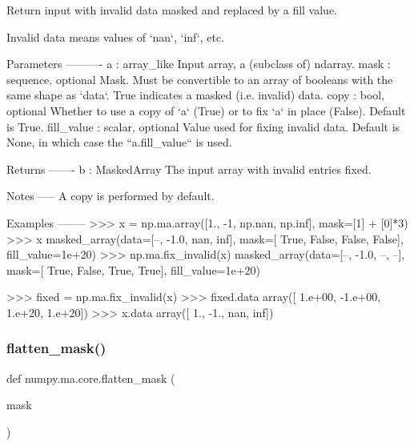 \begin{DoxyVerb}Return input with invalid data masked and replaced by a fill value.

Invalid data means values of `nan`, `inf`, etc.

Parameters
----------
a : array_like
    Input array, a (subclass of) ndarray.
mask : sequence, optional
    Mask. Must be convertible to an array of booleans with the same
    shape as `data`. True indicates a masked (i.e. invalid) data.
copy : bool, optional
    Whether to use a copy of `a` (True) or to fix `a` in place (False).
    Default is True.
fill_value : scalar, optional
    Value used for fixing invalid data. Default is None, in which case
    the ``a.fill_value`` is used.

Returns
-------
b : MaskedArray
    The input array with invalid entries fixed.

Notes
-----
A copy is performed by default.

Examples
--------
>>> x = np.ma.array([1., -1, np.nan, np.inf], mask=[1] + [0]*3)
>>> x
masked_array(data=[--, -1.0, nan, inf],
             mask=[ True, False, False, False],
       fill_value=1e+20)
>>> np.ma.fix_invalid(x)
masked_array(data=[--, -1.0, --, --],
             mask=[ True, False,  True,  True],
       fill_value=1e+20)

>>> fixed = np.ma.fix_invalid(x)
>>> fixed.data
array([ 1.e+00, -1.e+00,  1.e+20,  1.e+20])
>>> x.data
array([ 1., -1., nan, inf])\end{DoxyVerb}
 \mbox{\label{namespacenumpy_1_1ma_1_1core_a5c562e8b88bdd24c25ae41f0959fc262}} 
\subsubsection{\texorpdfstring{flatten\+\_\+mask()}{flatten\_mask()}}
{\footnotesize\ttfamily def numpy.\+ma.\+core.\+flatten\+\_\+mask (\begin{DoxyParamCaption}\item[{}]{mask }\end{DoxyParamCaption})}

